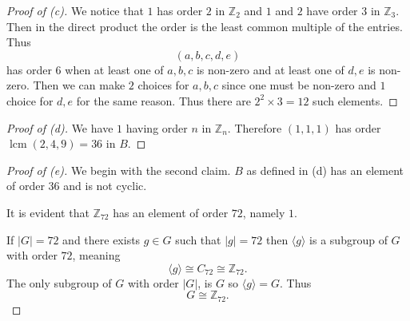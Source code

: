\begin{proof}[Proof of (c)]
    We notice that 
    $1$ has order $2$ in 
    $\mathbb Z_2$ and 
    $1$ and $2$ have order $3$ in 
    $\mathbb Z_3$. Then 
    in the direct product the order is 
    the least common multiple of the 
    entries. Thus 
    \[
        (a,b,c,d,e)
    \]
    has order $6$ when at least one 
    of $a,b,c$ is non-zero and at least 
    one of $d,e$ is non-zero. 
    Then we can make $2$ choices for 
    $a,b,c$ since one must be non-zero 
    and $1$ choice for $d,e$ for 
    the same reason. Thus there are 
    $2^2 \times 3 = 12$ such elements. 
\end{proof}
\begin{proof}[Proof of (d)]
    We have $1$ having 
    order $n$ in $\mathbb Z_n$. 
    Therefore $(1,1,1)$ has order 
    $\operatorname{lcm}(2,4,9) = 36$ in $B$. 
\end{proof}
\begin{proof}[Proof of (e)]
    We begin with the second claim. 
    $B$ as defined in (d) has an element of 
    order $36$ and is not cyclic. 

    It is evident that $\mathbb Z_{72}$ has an 
    element of order $72$, namely $1$. 

    If $|G| = 72$ and there exists 
    $g \in G$ such that $|g| = 72$ then 
    $
        \langle g \rangle
    $
    is a subgroup of $G$ with order $72$, 
    meaning 
    \[
        \langle g \rangle 
        \cong C_{72} \cong \mathbb Z_{72}. 
    \]
    The only subgroup of $G$ with order $|G|$, 
    is $G$ so $\langle g \rangle = G$. 
    Thus 
    \[
        G \cong \mathbb Z_{72}.
    \]
      
\end{proof}

